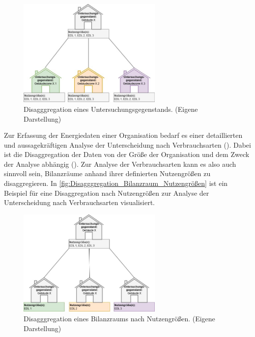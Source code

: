 \begin{figure}[H]
    \centering
    \includegraphics[width=0.63\textwidth]{../../Ressourcen/Abbildungen/Untersuchungsgegenstand_Zerlegt.jpg}
    \caption{Disagggregation eines Untersuchungsgegenstands. (Eigene Darstellung)}
    \label{fig:Disagggregation_Bilanzraum_Untersuchungsgegenstand}
\end{figure}

Zur Erfassung der Energiedaten einer Organisation bedarf es einer detaillierten und aussagekräftigen Analyse der Unterscheidung nach Verbrauchsarten 
(\cite[S. 14]{Hohnhold.2013}). Dabei ist die Disaggregation der Daten von der Größe der Organisation und dem Zweck der Analyse abhängig (\cite[S. 14f.]{Hohnhold.2013}).
Zur Analyse der Verbrauchsarten kann es also auch sinnvoll sein, Bilanzräume anhand ihrer definierten Nutzengrößen zu disaggregieren.
In \eqref{fig:Disagggregation_Bilanzraum_Nutzengrößen} ist ein Beispiel für eine Disaggregation nach Nutzengrößen 
zur Analyse der Unterscheidung nach Verbrauchsarten visualisiert.

\begin{figure}[H]
    \centering
    \includegraphics[width=0.63\textwidth]{../../Ressourcen/Abbildungen/Nutzengröße_Bewertungseinheit_Zerlegt.jpg}
    \caption{Disagggregation eines Bilanzraums nach Nutzengrößen. (Eigene Darstellung)}
    \label{fig:Disagggregation_Bilanzraum_Nutzengrößen}
\end{figure}